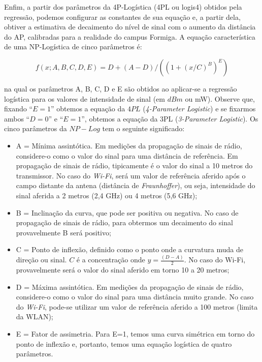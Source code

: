 \documentclass[
	12pt,				%
	twoside,			%
	a4paper,			%
	english,			%
	french,				%
	spanish,			%
	brazil				%
	]{abntex2}
\begin{document}
Enfim, a partir dos parâmetros da 4P-Logística (4PL ou logis4) obtidos
pela regressão, podemos configurar as constantes de sua equação e, a
partir dela, obtiver a estimativa de decaimento do nível de sinal com o
aumento da distância do AP, calibradas para a realidade do campus
Formiga. A equação característica de uma NP-Logística de cinco
parâmetros é:

\begin{equation}
f(x; A,B,C,D,E) = D + (A-D) / ( (1+(x/C)^B)^E )
\end{equation}

na qual os parâmetros A, B, C, D e E são obtidos ao aplicar-se a
regressão logística para os valores de intensidade de sinal (em \(dBm\)
ou mW). Observe que, fixando ``\(E=1\)'' obtemos a equação da \(4PL\)
(\emph{4-Parameter Logistic}) e se fixarmos ambos ``\(D=0\)'' e
``\(E=1\)'', obtemos a equação da 3PL (\emph{3-Parameter Logistic}). Os
cinco parâmetros da \(NP-Log\) tem o seguinte significado:

\begin{itemize}
\item
  A = Mínima assintótica. Em medições da propagação de sinais de rádio,
  considere-o como o valor do sinal para uma distância de referência. Em
  propagação de sinais de rádio, tipicamente é o valor do sinal a 10
  metros do transmissor. No caso do \emph{Wi-Fi}, será um valor de
  referência aferido após o campo distante da antena (distância de
  \emph{Fraunhoffer}), ou seja, intensidade do sinal aferida a 2 metros
  (2,4 GHz) ou 4 metros (5,6 GHz);
\item
  B = Inclinação da curva, que pode ser positiva ou negativa. No caso de
  propagação de sinais de rádio, para obtermos um decaimento do sinal
  provavelmente B será positivo;
\item
  C = Ponto de inflexão, definido como o ponto onde a curvatura muda de
  direção ou sinal. \(C\) é a concentração onde \(y = \frac{(D-A)}{2}\).
  No caso do Wi-Fi, provavelmente será o valor do sinal aferido em torno
  10 a 20 metros;
\item
  D = Máxima assintótica. Em medições da propagação de sinais de rádio,
  considere-o como o valor do sinal para uma distância muito grande. No
  caso do \emph{Wi-Fi}, pode-se utilizar um valor de referência aferido
  a 100 metros (limita da WLAN);
\item
  E = Fator de assimetria. Para E=1, temos uma curva simétrica em torno
  do ponto de inflexão e, portanto, temos uma equação logística de
  quatro parâmetros.
\end{itemize}
\end{document}
